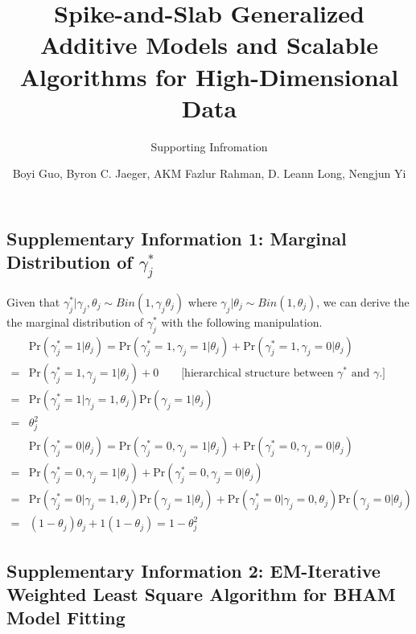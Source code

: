 \documentclass[
]{article}
\title{Spike-and-Slab Generalized Additive Models and Scalable
Algorithms for High-Dimensional Data}
\subtitle{Supporting Infromation}
\author{Boyi Guo, Byron C. Jaeger, AKM Fazlur Rahman, D. Leann Long,
Nengjun Yi}
\date{}
\begin{document}
\maketitle

\newcommand{\tp}{*}
\newcommand{\pr}{\text{Pr}}
\newcommand{\bs}[1]{\boldsymbol{#1}}
\newcommand{\simiid}{\overset{\text{iid}}{\sim}}

\subsection{Supplementary Information 1: Marginal Distribution of $\gamma_j^*$}

Given that
\(\gamma_{j}^*| \gamma_{j}, \theta_j \sim Bin(1, \gamma_{j}\theta_j)\)
where \(\gamma_{j} | \theta_j \sim Bin(1, \theta_j)\), we can derive the
the marginal distribution of \(\gamma_{j}^*\) with the following
manipulation. \begin{align*}
& \text{Pr}(\gamma_j^*= 1 | \theta_j)  = \text{Pr}(\gamma_j^*= 1, \gamma_j = 1 | \theta_j) + \text{Pr}(\gamma_j^*= 1 , \gamma_j = 0| \theta_j)\\
= & \text{Pr}(\gamma_j^*= 1, \gamma_j = 1 | \theta_j) + 0 \qquad \text{[hierarchical structure between }\gamma^*\text{ and }\gamma \text{.]}\\
= & \text{Pr}(\gamma_j^*= 1| \gamma_j = 1,  \theta_j)\text{Pr}(\gamma_j = 1| \theta_j)\\
= & \theta_j^2\\
& \text{Pr}(\gamma_j^*= 0 | \theta_j)  = \text{Pr}(\gamma_j^*= 0, \gamma_j = 1 | \theta_j) + \text{Pr}(\gamma_j^*= 0 , \gamma_j = 0| \theta_j)\\
= & \text{Pr}(\gamma_j^*= 0, \gamma_j = 1 | \theta_j) + \text{Pr}(\gamma_j^*= 0, \gamma_j = 0 | \theta_j)\\
= & \text{Pr}(\gamma_j^*= 0| \gamma_j = 1,  \theta_j)\text{Pr}(\gamma_j = 1| \theta_j) + \text{Pr}(\gamma_j^*= 0| \gamma_j = 0,  \theta_j)\text{Pr}(\gamma_j = 0| \theta_j)\\
= & (1-\theta_j)\theta_j + 1(1-\theta_j) = 1-\theta_j^2
\end{align*}

\clearpage

\subsection{Supplementary Information 2: EM-Iterative Weighted Least Square Algorithm for BHAM Model Fitting}
\end{document}
